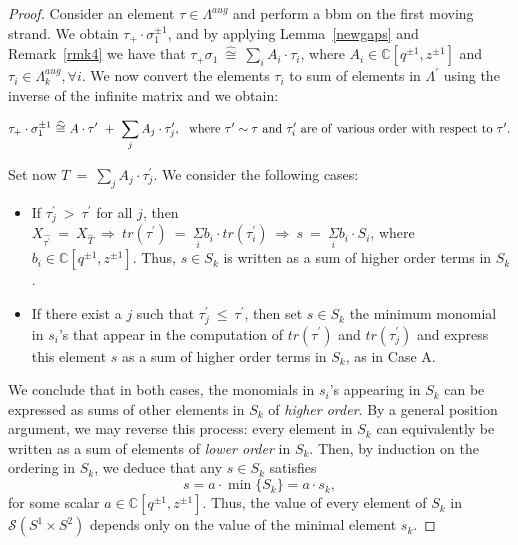 \documentclass[11pt]{amsart}
\begin{document}
\begin{proof}

Consider an element $\tau \in \Lambda^{aug}$ and perform a bbm on the first moving strand. We obtain $\tau_+\cdot \sigma_1^{\pm 1}$, and by applying Lemma~\ref{newgaps} and Remark~\ref{rmk4} we have that $\tau_+\sigma_1 \ \widehat{\cong}\ \sum_i A_i\cdot \tau_i$, where $A_i\in \mathbb{C}[q^{\pm 1}, z^{\pm 1}]$ and $\tau_i\in \Lambda^{aug}_k, \forall i$. We now convert the elements $\tau_i$ to sum of elements in $\Lambda^{\prime}$ using the inverse of the infinite matrix and we obtain:

\[
\tau_+\cdot \sigma_1^{\pm 1}\ \widehat{\cong}\ A\cdot \tau^{\prime}\ +\ \sum_j A_j\cdot \tau_j^{\prime},\ \ {\rm where}\ \tau^{\prime} \sim \tau\ {\rm and}\ \tau_i^{\prime}\ {\rm are\ of\ various\ order\ with\ respect\ to}\ \tau^{\prime}.
\] 

\noindent Set now $T\ =\  \sum_j A_j\cdot \tau_j^{\prime}$. We consider the following cases:

\bigbreak

\begin{itemize}
\item[Case\ A.] If $\tau_j^{\prime}\ >\ \tau^{\prime}$ for all $j$, then $X_{\widehat{\tau^{\prime}}}\ =\ X_{\widehat{T}}\ \Rightarrow\ tr(\tau^{\prime})\ =\ \underset{i}{\Sigma}b_i \cdot tr(\tau_i^{\prime})\ \Rightarrow\ s\ =\ \underset{i}{\Sigma}b_i \cdot S_i$, where $b_i\in \mathbb{C}[q^{\pm 1}, z^{\pm 1}]$. Thus, $s\in S_k$ is written as a sum of higher order terms in $S_k$.

\bigbreak

\item[Case\ B.] If there exist a $j$ such that $\tau_j^{\prime}\ \leq \ \tau^{\prime}$, then set $s\in S_k$ the minimum monomial in $s_i$'s that appear in the computation of $tr(\tau^{\prime})$ and $tr(\tau_j^{\prime})$ and express this element $s$ as a sum of higher order terms in $S_k$, as in Case A.
\end{itemize}

\noindent We conclude that in both cases, the monomials in $s_i$'s appearing in $S_k$ can be expressed as sums of other elements in $S_k$ of \emph{higher order}. By a general position argument, we may reverse this process: every element in $S_k$ can equivalently be written as a sum of elements of \emph{lower order} in $S_k$. Then, by induction on the ordering in $S_k$, we deduce that any $s \in S_k$ satisfies
\[
s = a \cdot \min\{S_k\} = a \cdot s_k,
\]
for some scalar $a \in \mathbb{C}[q^{\pm1}, z^{\pm1}]$. Thus, the value of every element of $S_k$ in $\mathcal{S}(S^1 \times S^2)$ depends only on the value of the minimal element $s_k$.



\end{proof}
\end{document}
